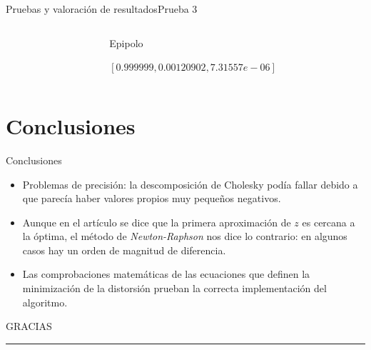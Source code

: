 \documentclass[14pt,spanish]{beamer}
\begin{document}
\begin{frame}{Pruebas y valoración de resultados}{Prueba 3}
\begin{overlayarea}{\textwidth}{8cm}
{\begin{columns}
\begin{column}{0.2\textwidth}
              \end{column}
              \begin{column}{0.8\textwidth}
                Epipolo

                $[0.999999, 0.00120902, 7.31557e-06]$
              \end{column}
            \end{columns}

            }

        \end{overlayarea}
      \end{frame}

    \section{Conclusiones}

    \begin{frame}{Conclusiones}

      \begin{itemize}
        \item Problemas de precisión: la descomposición de Cholesky podía fallar debido a que parecía haber valores propios muy pequeños negativos.
        \item Aunque en el artículo se dice que la primera aproximación de $z$ es cercana a la óptima, el método de \emph{Newton-Raphson} nos dice lo contrario: en algunos casos hay un orden de magnitud de diferencia.
        \item Las comprobaciones matemáticas de las ecuaciones que definen la minimización de la distorsión prueban la correcta implementación del algoritmo.
      \end{itemize}
    \end{frame}

    \begin{frame}[plain]
      \huge{GRACIAS}
      \vspace{2mm}
      \hrule
    \end{frame}
\end{document}
